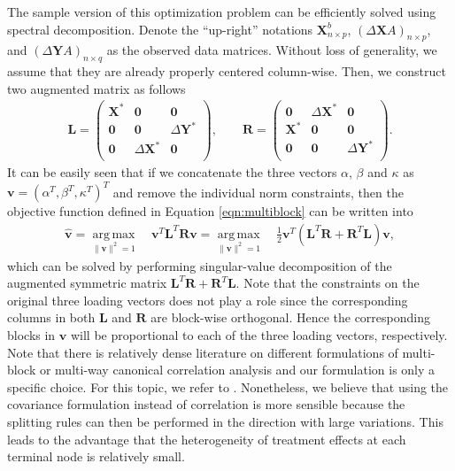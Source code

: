 \documentclass[smallextended]{svjour3}
\DeclareMathOperator*{\argmax}{arg\,max}
\begin{document}
The sample version of this optimization problem can be efficiently solved using spectral decomposition. Denote the ``up-right'' notations $\textbf{X}^b_{n \times p}$, $(\Delta \textbf{X}A)_{n \times p}$, and $(\Delta \textbf{Y}A)_{n \times q}$ as the observed data matrices. Without loss of generality, we assume that they are already properly centered column-wise. Then, we construct two augmented matrix as follows
\begin{align*}
\textbf{L} = \begin{pmatrix}
\textbf{X}^* & \textbf{0} & \textbf{0} \\
\textbf{0} & \textbf{0} &\Delta \textbf{Y}^*\\
\textbf{0} & \Delta \textbf{X}^*& \textbf{0}\\
\end{pmatrix},
\qquad
\textbf{R} = \begin{pmatrix}
\textbf{0} & \Delta \textbf{X}^* & \textbf{0}\\
\textbf{X}^* & \textbf{0} & \textbf{0} \\
\textbf{0} & \textbf{0} &\Delta \textbf{Y}^*\\
\end{pmatrix}.
\end{align*}
It can be easily seen that if we concatenate the three vectors $\alpha$, $\beta$ and $\kappa$ as $\bm{v} = (\alpha^T, \beta^T, \kappa^T)^T$ and remove the individual norm constraints, then the objective function defined in Equation \eqref{eqn:multiblock} can be written into
\begin{align}
\widehat{\bm{v}} = \argmax\limits_{\lVert\bm{v}\rVert^2 = 1} \quad \bm{v}^T \textbf{L}^T \textbf{R} \bm{v}
= \argmax\limits_{\lVert\bm{v}\rVert^2 = 1} \quad \frac{1}{2} \bm{v}^T (\textbf{L}^T \textbf{R} + \textbf{R}^T \textbf{L}) \bm{v},
\end{align}
which can be solved by performing singular-value decomposition of the augmented symmetric matrix $\textbf{L}^T \textbf{R} + \textbf{R}^T \textbf{L}$. Note that the constraints on the original three loading vectors does not play a role since the corresponding columns in both $\textbf{L}$ and $\textbf{R}$ are block-wise orthogonal. Hence the corresponding blocks in $\bm{v}$ will be proportional to each of the three loading vectors, respectively. Note that there is relatively dense literature on different formulations of multi-block or multi-way canonical correlation analysis and our formulation is only a specific choice. For this topic, we refer to \cite{tenenhaus2017regularized}. Nonetheless, we believe that using the covariance formulation instead of correlation is more sensible because the splitting rules can then be performed in the direction with large variations. This leads to the advantage that the heterogeneity of treatment effects at each terminal node is relatively small. 
\end{document}
